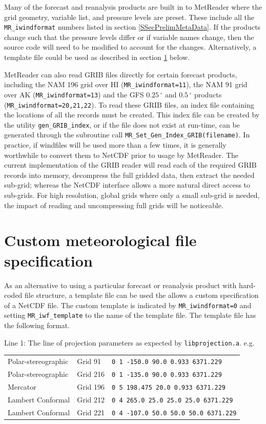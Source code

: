 \documentclass[11pt]{article}   %
\begin{document}
Many of the forecast and reanalysis products are built in to MetReader where the
grid geometry, variable list, and pressure levels are preset.  These include all
the \texttt{MR\_iwindformat} numbers listed in section \ref{SSecPrelimMetaData}.  If the
products change such that the pressure levels differ or if variable names change,
then the source code will need to be modified to account for the changes.
Alternatively, a template file could be used as described in section \ref{SecCust} below.

MetReader can also read GRIB files directly for certain forecast products, including the
NAM 196 grid over HI (\texttt{MR\_iwindformat=11}), the NAM 91 grid over AK
(\texttt{MR\_iwindformat=13}) and the GFS $0.25 \, ^{\circ}$ and $0.5 \, ^{\circ}$
products (\texttt{MR\_iwindformat=20,21,22}).  To read these GRIB files, an index
file containing the locations of all the records must be created.
This index file can be created 
by the utility \texttt{gen\_GRIB\_index}, or if the file does not exist at
run-time, can be generated through the subroutine call
\texttt{MR\_Set\_Gen\_Index\_GRIB(filename)}.  In practice, if windfiles will be used
more than a few times, it is generally worthwhile to convert them to NetCDF prior
to usage by MetReader.  The current
implementation of the GRIB reader will read each of the required GRIB records into
memory, decompress the full gridded data, then extract the needed sub-grid; whereas the 
NetCDF interface allows a more natural direct access to sub-grids.  For high resolution,
global grids where only a small sub-grid is needed, the impact of reading and uncompressing
full grids will be noticeable.

\section{Custom meteorological file specification}\label{SecCust}
As an alternative to using a particular forecast or reanalysis product with
hard-coded file structure, a template file can be used the allows a custom
specification of a NetCDF file.
The custom template is indicated by \texttt{MR\_iwindformat=0} and setting \texttt{MR\_iwf\_template}
to the name of the template file.  The template file has the following format.

Line 1: The line of projection parameters as expected by \texttt{libprojection.a}.
e.g.
\\
\begin{tabular}{ l  l  l }
Polar-stereographic & Grid 91  & \verb|0 1 -150.0 90.0 0.933 6371.229| \\
Polar-stereographic & Grid 216 & \verb|0 1 -135.0 90.0 0.933 6371.229| \\
Mercator            & Grid 196 & \verb|0 5 198.475 20.0 0.933 6371.229| \\
Lambert Conformal   & Grid 212 & \verb|0 4 265.0 25.0 25.0 25.0 6371.229| \\
Lambert Conformal   & Grid 221 & \verb|0 4 -107.0 50.0 50.0 50.0 6371.229| \\
\end{tabular}
\end{document}
